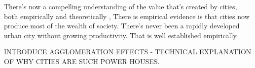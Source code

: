 There's now a compelling understanding of the value that's created by cities, both empirically and theoretically \cite{jacobsEconomyCities1969, spenceUrbanizationGrowth2009, bettencourtIntroductionUrbanScience2021}, 
There is empirical evidence is that cities now produce most of the wealth of society. There's never been a rapidly developed urban city without growing productivity. That is well established empirically. 

INTRODUCE AGGLOMERATION EFFECTS - TECHNICAL EXPLANATION OF WHY CITIES ARE SUCH POWER HOUSES.









